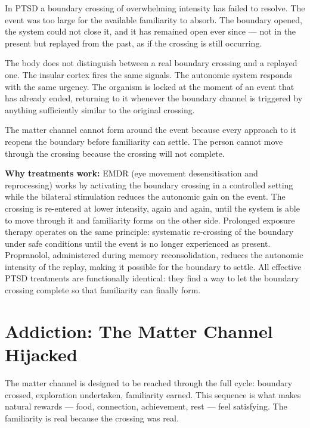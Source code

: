 \documentclass[12pt]{article}
\begin{document}
In PTSD a boundary crossing of overwhelming intensity has failed to resolve. The
event was too large for the available familiarity to absorb. The boundary
opened, the system could not close it, and it has remained open ever since ---
not in the present but replayed from the past, as if the crossing is still
occurring.

The body does not distinguish between a real boundary crossing and a replayed
one. The insular cortex fires the same signals. The autonomic system responds
with the same urgency. The organism is locked at the moment of an event that has
already ended, returning to it whenever the boundary channel is triggered by
anything sufficiently similar to the original crossing.

The matter channel cannot form around the event because every approach to it
reopens the boundary before familiarity can settle. The person cannot move
through the crossing because the crossing will not complete.

\textbf{Why treatments work:}
EMDR (eye movement desensitisation and reprocessing) works by activating the
boundary crossing in a controlled setting while the bilateral stimulation reduces
the autonomic gain on the event. The crossing is re-entered at lower intensity,
again and again, until the system is able to move through it and familiarity
forms on the other side. Prolonged exposure therapy operates on the same
principle: systematic re-crossing of the boundary under safe conditions until the
event is no longer experienced as present. Propranolol, administered during
memory reconsolidation, reduces the autonomic intensity of the replay, making it
possible for the boundary to settle. All effective PTSD treatments are
functionally identical: they find a way to let the boundary crossing complete so
that familiarity can finally form.

\section{Addiction: The Matter Channel Hijacked}

The matter channel is designed to be reached through the full cycle: boundary
crossed, exploration undertaken, familiarity earned. This sequence is what makes
natural rewards --- food, connection, achievement, rest --- feel satisfying. The
familiarity is real because the crossing was real.
\end{document}
